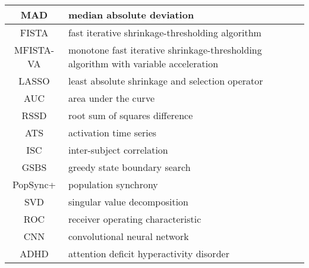 \begin{table}[h]
\begin{tabular}{|c|p{}|}
    \hline
    MAD & median absolute deviation \\
    \hline
    FISTA & fast iterative shrinkage-thresholding algorithm \\
    \hline
    MFISTA-VA & monotone fast iterative shrinkage-thresholding algorithm with variable acceleration \\
    \hline
    LASSO & least absolute shrinkage and selection operator \\
    \hline
    AUC & area under the curve \\
    \hline
    RSSD & root sum of squares difference \\
    \hline
    ATS & activation time series \\
    \hline
    ISC & inter-subject correlation \\
    \hline
    GSBS & greedy state boundary search \\
    \hline
    PopSync+ & population synchrony \\
    \hline
    SVD & singular value decomposition \\
    \hline
    ROC & receiver operating characteristic \\
    \hline
    CNN & convolutional neural network \\
    \hline
    ADHD & attention deficit hyperactivity disorder \\
    \hline
    \end{tabular}
\end{table}
